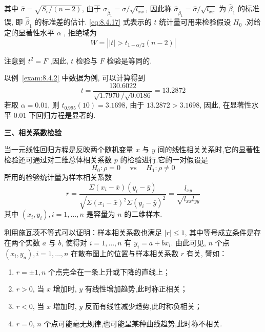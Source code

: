 其中 $\hat{\sigma} =\sqrt{S_{e}/(n-2)}$, 由于 $\sigma_{\hat{\beta}_1}=\sigma/\sqrt{l_{xx}}$, 因此称 $\hat{\sigma}_{\hat{\beta}_1}=\hat{\sigma}/\sqrt{l_{xx}} $ 为 $\hat{\beta}_1$ 的标准误, 即 $\hat{\beta}_1$ 的标准差的估计. \ref{eq:8.4.17} 式表示的 $t$ 统计量可用来检验假设 $H_0$ .对给定的显著性水平 $\alpha$ , 拒绝域为
\begin{equation*}
W= \left| |t| > t_{1-\alpha/2} (n-2) \right|
\end{equation*}

注意到 $t^2=F$ ,因此, $t$ 检验与 $F$ 检验是等同的.

以例~\ref{exam:8.4.2} 中数据为例, 可以计算得到
\begin{equation*}
t=\frac{130.6022}{\sqrt{1.7970} / \sqrt{0.0186}}=13.2872
\end{equation*}
若取 $\alpha=0.01$, 则 $t_{0.995}(10)=3.1698$, 由于 $13.2872>3.1698$, 因此, 在显著性水平 $0.01$ 下回归方程是显著的.


\textbf{三、相关系数检验}

当一元线性回归方程是反映两个随机变量 $x$ 与 $y$ 间的线性相关关系时,它的显著性检验还可通过对二维总体相关系数 $p$ 的检验进行.它的一对假设是
\begin{equation}
H_{0} : \rho=0 \quad \text { vs } \quad H_{1} : \rho \neq 0
\end{equation}
所用的检验统计量为样本相关系数
\begin{equation}
r=\frac{\Sigma\left(x_{i}-\bar{x}\right)\left(y_{i}-\bar{y}\right)}{\sqrt{\Sigma\left(x_{i}-\bar{x}\right)^{2} \Sigma\left(y_{i}-\bar{y}\right)^{2}}}=\frac{l_{x y}}{\sqrt{l_{x x} l_{y y}}}
\end{equation}
其中 $(x_i,y_i), i=1, \ldots, n$ 是容量为 $n$ 的二维样本.

利用施瓦茨不等式可以证明：样本相关系数也满足  $\left| r \right|\le 1$, 其中等号成立条件是存在两个实数 $a$ 与 $b$, 使得对 $i=1,\ldots, n$ 有 $y_i = a + b x_i$. 由此可见, $n$ 个点 $(x_{i}, y_{u}), i=1, \ldots, n$ 在散布图上的位置与样本相关系数 $r$ 有关, 譬如：
\begin{enumerate}
  \item  $r=\pm 1,n$ 个点完全在一条上升或下降的直线上；
  \item  $r>0$, 当 $x$ 增加时, $y$ 有线性增加趋势,此时称正相关；
  \item  $r<0$, 当 $x$ 增加时, $y$ 反而有线性减少趋势,此时称负相关；
  \item  $r=0$, $n$ 个点可能毫无规律,也可能呈某种曲线趋势,此时称不相关.
\end{enumerate}

